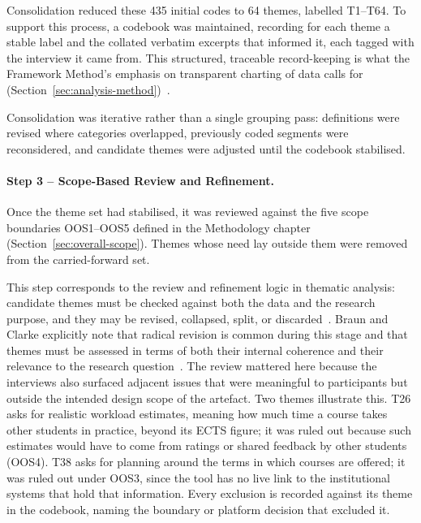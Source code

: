 Consolidation reduced these 435 initial codes to 64 themes, labelled T1--T64. To support this process, a codebook was maintained, recording for each theme a stable label and the collated verbatim excerpts that informed it, each tagged with the interview it came from.
This structured, traceable record-keeping is what the Framework Method's emphasis on transparent charting of data calls for (Section~\ref{sec:analysis-method})~\cite{gale_using_2013}.

Consolidation was iterative rather than a single grouping pass: definitions were revised where categories overlapped, previously coded segments were reconsidered, and candidate themes were adjusted until the codebook stabilised.

\paragraph{Step 3 -- Scope-Based Review and Refinement.}
\label{sec:scope-refinement}

Once the theme set had stabilised, it was reviewed against the five scope boundaries OOS1--OOS5 defined in the Methodology chapter (Section~\ref{sec:overall-scope}). Themes whose need lay outside them were removed from the carried-forward set.

This step corresponds to the review and refinement logic in thematic analysis: candidate themes must be checked against both the data and the research purpose, and they may be revised, collapsed, split, or discarded~\cite[pp.~35--36, 97--111]{braun_thematic_2022}. Braun and Clarke explicitly note that radical revision is common during this stage and that themes must be assessed in terms of both their internal coherence and their relevance to the research question~\cite[pp.~35--36]{braun_thematic_2022}. The review mattered here because the interviews also surfaced adjacent issues that were meaningful to participants but outside the intended design scope of the artefact. Two themes illustrate this. T26 asks for realistic workload estimates, meaning how much time a course takes other students in practice, beyond its ECTS figure; it was ruled out because such estimates would have to come from ratings or shared feedback by other students (OOS4). T38 asks for planning around the terms in which courses are offered; it was ruled out under OOS3, since the tool has no live link to the institutional systems that hold that information. Every exclusion is recorded against its theme in the codebook, naming the boundary or platform decision that excluded it.

